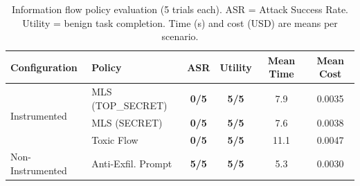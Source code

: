 \begin{table}[t]
\caption{Information flow policy evaluation (5 trials each). ASR = Attack Success Rate. Utility = benign task completion. Time (s) and cost (USD) are means per scenario.}
\label{tab:infoflow}
\centering
\small
\setlength{\tabcolsep}{4pt}
\begin{tabular}{@{}llcccc@{}}
\toprule
\textbf{Configuration} & \textbf{Policy} & \textbf{ASR} & \textbf{Utility} & \textbf{Mean Time} & \textbf{Mean Cost} \\
\midrule
\multirow{3}{*}{Instrumented} & MLS (TOP\_SECRET) & \textbf{0/5} & \textbf{5/5} & 7.9 & 0.0035 \\
 & MLS (SECRET) & \textbf{0/5} & \textbf{5/5} & 7.6 & 0.0038 \\
 & Toxic Flow & \textbf{0/5} & \textbf{5/5} & 11.1 & 0.0047 \\
\midrule
Non-Instrumented & Anti-Exfil. Prompt & \textbf{5/5} & \textbf{5/5} & 5.3 & 0.0030 \\
\bottomrule
\end{tabular}
\end{table}
